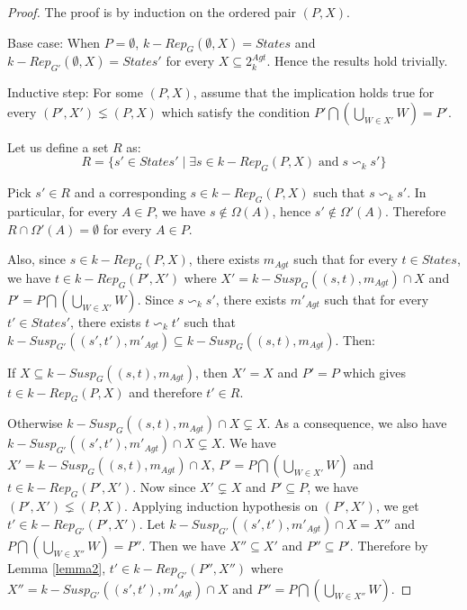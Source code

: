 \begin{proof}
The proof is by induction on the ordered pair $(P, X)$.

Base case: When $P = \emptyset$, $k-Rep_{G}(\emptyset, X) = States$ and $k-Rep_{G'}(\emptyset, X) = States'$ for every $X \subseteq 2^{Agt}_{k}$. Hence the results hold trivially.

Inductive step: For some $(P, X)$, assume that the implication holds true for every $(P', X') \lneq (P, X)$ which satisfy the condition $P' \bigcap \left( \bigcup \limits_{W \in X'}W \right) = P'$.

Let us define a set $R$ as:
\[R = \lbrace s' \in States' \; \vert \; \exists s \in k-Rep_{G}(P, X) \; \text{and} \; s \backsim_{k} s' \rbrace\]

Pick $s' \in R$ and a corresponding $s \in k-Rep_{G}(P, X)$ such that $s \backsim_{k} s'$. In particular, for every $A \in P$, we have $s \notin \Omega(A)$, hence $s' \notin \Omega'(A)$. Therefore $R \cap \Omega'(A) = \emptyset$ for every $A \in P$.

Also, since $s \in k-Rep_{G}(P, X)$, there exists $m_{Agt}$ such that for every $t \in States$, we have $t \in k-Rep_{G}(P', X')$ where $X' = k-Susp_{G}((s, t), m_{Agt}) \cap X$ and $P' = P \bigcap \left( \bigcup \limits_{W \in X'}W \right)$. Since $s \backsim_{k} s'$, there exists $m'_{Agt}$ such that for every $t' \in States'$, there exists $t \backsim_{k} t'$ such that $k-Susp_{G'}((s', t'), m'_{Agt}) \subseteq k-Susp_{G}((s, t), m_{Agt})$. Then:

If $X \subseteq k-Susp_{G}((s, t), m_{Agt})$, then $X' = X$ and $P' = P$ which gives $t \in k-Rep_{G}(P, X)$ and therefore $t' \in R$.

Otherwise $k-Susp_{G}((s, t), m_{Agt}) \cap X \subsetneq X$. As a consequence, we also have $k-Susp_{G'}((s', t'), m'_{Agt}) \cap X \subsetneq X$. We have $X' = k-Susp_{G}((s, t), m_{Agt}) \cap X$, $P' = P \bigcap \left( \bigcup \limits_{W \in X'}W \right)$ and $t \in k-Rep_{G}(P', X')$. Now since $X' \subsetneq X$ and $P' \subseteq P$, we have $(P', X') \lneq (P, X)$. Applying induction hypothesis on $(P', X')$, we get $t' \in k-Rep_{G'}(P', X')$. Let $k-Susp_{G'}((s', t'), m'_{Agt}) \cap X = X''$ and $P \bigcap \left( \bigcup \limits_{W \in X''}W \right) = P''$. Then we have $X'' \subseteq X'$ and $P'' \subseteq P'$. Therefore by Lemma \ref{lemma2}, $t' \in k-Rep_{G'}(P'', X'')$ where $X'' = k-Susp_{G'}((s', t'), m'_{Agt}) \cap X$ and $P'' = P \bigcap \left( \bigcup \limits_{W \in X''}W \right)$.


\end{proof}
